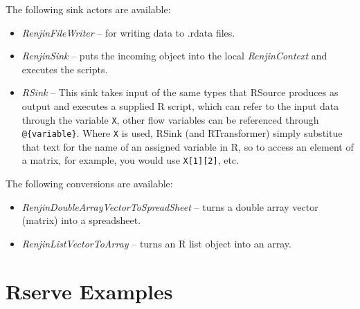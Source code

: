 \documentclass[a4paper]{book}
\begin{document}
\noindent The following sink actors are available:
\begin{itemize}
	\item \textit{RenjinFileWriter} -- for writing data to .rdata files.
	\item \textit{RenjinSink} -- puts the incoming object into the local \textit{RenjinContext}
	and executes the scripts.
	\item \textit{RSink} -- This sink takes input of the same types that RSource
	produces as output and executes a supplied R script, which can refer to the
	input data through the variable \verb|X|, other flow variables can be
	referenced through \verb|@{variable}|.
	Where \verb|X| is used, RSink (and RTransformer) simply substitue that text for the name of an assigned variable
	in R, so to access an element of a matrix, for example, you would use
	\verb|X[1][2]|, etc.
\end{itemize}

\noindent The following conversions are available:
\begin{itemize}
	\item \textit{RenjinDoubleArrayVectorToSpreadSheet} -- turns a double array vector
	(matrix) into a spreadsheet.
	\item \textit{RenjinListVectorToArray} -- turns an R list object into an array.
\end{itemize}

\newpage
\section{Rserve Examples}
\end{document}

